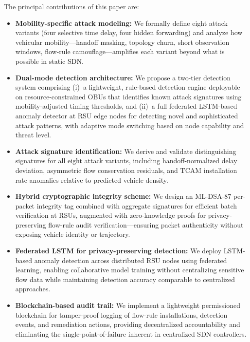 \documentclass[12pt, a4paper]{report}
\begin{document}
The principal contributions of this paper are:
\begin{itemize}
    \item \textbf{Mobility-specific attack modeling:} We formally define 
    eight attack variants (four selective time delay, four hidden 
    forwarding) and analyze how vehicular mobility---handoff masking, 
    topology churn, short observation windows, flow-rule 
    camouflage---amplifies each variant beyond what is possible in 
    static SDN.
    
    \item \textbf{Dual-mode detection architecture:} We propose a 
    two-tier detection system comprising (i)~a lightweight, rule-based 
    detection engine deployable on resource-constrained OBUs that 
    identifies known attack signatures using mobility-adjusted timing 
    thresholds, and (ii)~a full federated LSTM-based anomaly detector 
    at RSU edge nodes for detecting novel and sophisticated attack 
    patterns, with adaptive mode switching based on node capability 
    and threat level.
    
    \item \textbf{Attack signature identification:} We derive and 
    validate distinguishing signatures for all eight attack variants, 
    including handoff-normalized delay deviation, asymmetric flow 
    conservation residuals, and TCAM installation rate anomalies 
    relative to predicted vehicle density.
    
    \item \textbf{Hybrid cryptographic integrity scheme:} We design 
    an ML-DSA-87 per-packet integrity tag combined with aggregate 
    signatures for efficient batch verification at RSUs, augmented 
    with zero-knowledge proofs for privacy-preserving flow-rule 
    audit verification---ensuring packet authenticity without 
    exposing vehicle identity or trajectory.
    
    \item \textbf{Federated LSTM for privacy-preserving detection:} 
    We deploy LSTM-based anomaly detection across distributed RSU 
    nodes using federated learning, enabling collaborative model 
    training without centralizing sensitive flow data while 
    maintaining detection accuracy comparable to centralized 
    approaches.
    
    \item \textbf{Blockchain-based audit trail:} We implement a 
    lightweight permissioned blockchain for tamper-proof logging of 
    flow-rule installations, detection events, and remediation 
    actions, providing decentralized accountability and eliminating 
    the single-point-of-failure inherent in centralized SDN 
    controllers.


\end{itemize}
\end{document}
